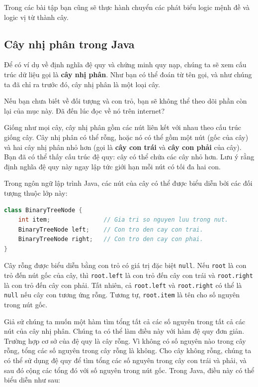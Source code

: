 Trong các bài tập bạn cũng sẽ thực hành chuyển các phát biểu logic mệnh đề và logic vị từ thành cây.

\subsection{Cây nhị phân trong Java}

Để có ví dụ về định nghĩa đệ quy và chứng minh quy nạp, chúng ta sẽ xem cấu trúc dữ liệu gọi là \textbf{cây nhị phân}. Như bạn có thể đoán từ tên gọi, và như chúng ta đã chỉ ra trước đó, cây nhị phân là một loại cây.

\begin{warningbox}
Nếu bạn chưa biết về đối tượng và con trỏ, bạn sẽ không thể theo dõi phần còn lại của mục này. Đã đến lúc đọc về nó trên internet?
\end{warningbox}

Giống như mọi cây, cây nhị phân gồm các nút liên kết với nhau theo cấu trúc giống cây. Cây nhị phân có thể rỗng, hoặc nó có thể gồm một nút (gốc của cây) và hai cây nhị phân nhỏ hơn (gọi là \textbf{cây con trái} và \textbf{cây con phải} của cây). Bạn đã có thể thấy cấu trúc đệ quy: cây có thể chứa các cây nhỏ hơn. Lưu ý rằng định nghĩa đệ quy này ngay lập tức giới hạn mỗi nút có tối đa hai con.

Trong ngôn ngữ lập trình Java, các nút của cây có thể được biểu diễn bởi các đối tượng thuộc lớp này:
\begin{lstlisting}[language=Java]
class BinaryTreeNode {
    int item;               // Gia tri so nguyen luu trong nut.
    BinaryTreeNode left;    // Con tro den cay con trai.
    BinaryTreeNode right;   // Con tro den cay con phai.
}
\end{lstlisting}

Cây rỗng được biểu diễn bằng con trỏ có giá trị đặc biệt \texttt{null}. Nếu \texttt{root} là con trỏ đến nút gốc của cây, thì \texttt{root.left} là con trỏ đến cây con trái và \texttt{root.right} là con trỏ đến cây con phải. Tất nhiên, cả \texttt{root.left} và \texttt{root.right} có thể là \texttt{null} nếu cây con tương ứng rỗng. Tương tự, \texttt{root.item} là tên cho số nguyên trong nút gốc.

Giả sử chúng ta muốn một hàm tìm tổng tất cả các số nguyên trong tất cả các nút của cây nhị phân. Chúng ta có thể làm điều này với hàm đệ quy đơn giản. Trường hợp cơ sở của đệ quy là cây rỗng. Vì không có số nguyên nào trong cây rỗng, tổng các số nguyên trong cây rỗng là không. Cho cây không rỗng, chúng ta có thể sử dụng đệ quy để tìm tổng các số nguyên trong cây con trái và phải, và sau đó cộng các tổng đó với số nguyên trong nút gốc. Trong Java, điều này có thể biểu diễn như sau:


